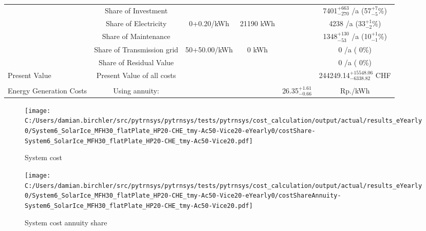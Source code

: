\documentclass[english]{SPFShortReport}
\begin{document}
\begin{table}[!ht]
\begin{adjustbox}{max width =\textwidth}
\begin{tabular}{l | c c c c c }
 & Share of Investment & &&& 7401$^{\mathrm{+663}}_{\mathrm{-270}}$ /a (57$^{\mathrm{+ 7}}_{\mathrm{- 5}}$\%) \\
 & Share of Electricity & 0+0.20/kWh & 21190 kWh &  & 4238 /a (33$^{\mathrm{+ 1}}_{\mathrm{- 2}}$\%)\\
 & Share of Maintenance & &&& 1348$^{\mathrm{+130}}_{\mathrm{-53}}$ /a (10$^{\mathrm{+ 1}}_{\mathrm{- 1}}$\%)\\ 
 & Share of Transmission grid & 50+50.00/kWh & 0 kWh & &  0 /a ( 0\%)\\
 & Share of Residual Value &&& &  0 /a ( 0\%)\\
Present Value  & Present Value of all costs  & &&& 244249.14$^{\mathrm{+15548.06}}_{\mathrm{-6338.82}}$ CHF \\
\hline \\ 
 Energy Generation Costs & Using annuity: &&& 26.35$^{\mathrm{+1.61}}_{\mathrm{-0.66}}$ & Rp./kWh \\
\hline
\hline
\end{tabular}
\end{adjustbox}
\label{CostsTable}
\end{table}
\begin{figure}[!htbp]
\begin{center}
\texttt{[image: C:/Users/damian.birchler/src/pytrnsys/pytrnsys/tests/pytrnsys/cost\_calculation/output/actual/results\_eYearly0/System6\_SolarIce\_MFH30\_flatPlate\_HP20-CHE\_tmy-Ac50-Vice20-eYearly0/costShare-System6\_SolarIce\_MFH30\_flatPlate\_HP20-CHE\_tmy-Ac50-Vice20.pdf]}
\caption{System cost}
\label{systemCost}
\end{center}
\end{figure}
\begin{figure}[!htbp]
\begin{center}
\texttt{[image: C:/Users/damian.birchler/src/pytrnsys/pytrnsys/tests/pytrnsys/cost\_calculation/output/actual/results\_eYearly0/System6\_SolarIce\_MFH30\_flatPlate\_HP20-CHE\_tmy-Ac50-Vice20-eYearly0/costShareAnnuity-System6\_SolarIce\_MFH30\_flatPlate\_HP20-CHE\_tmy-Ac50-Vice20.pdf]}
\caption{System cost annuity share}
\label{systemCostannuity}
\end{center}
\end{figure}
\end{document}
